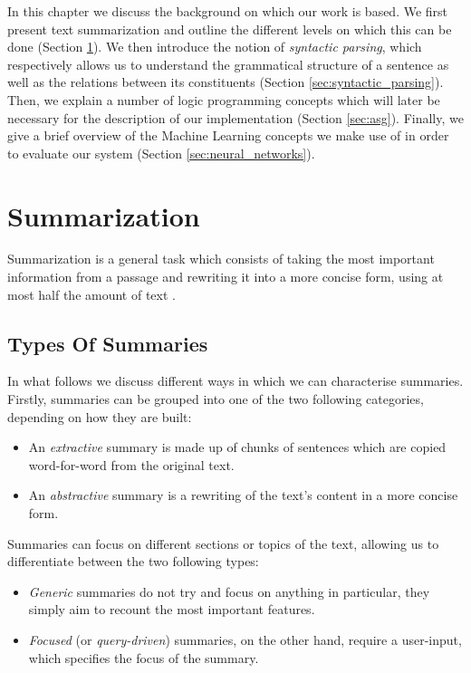 \label{chapter:background}

In this chapter we discuss the background on which our work is based. We first present text summarization and outline the different levels on which this can be done (Section \ref{sec:summarization}). We then introduce the notion of \textit{syntactic parsing}, which respectively allows us to understand the grammatical structure of a sentence as well as the relations between its constituents (Section \ref{sec:syntactic_parsing}). Then, we explain a number of logic programming concepts which will later be necessary for the description of our implementation (Section \ref{sec:asg}). Finally, we give a brief overview of the Machine Learning concepts we make use of in order to evaluate our system (Section \ref{sec:neural_networks}).

\section{Summarization}
\label{sec:summarization}

Summarization is a general task which consists of taking the most important information from a passage and rewriting it into a more concise form, using at most half the amount of text \cite{lloret_text_2008}.

\subsection{Types Of Summaries}

In what follows we discuss different ways in which we can characterise summaries. Firstly, summaries can be grouped into one of the two following categories, depending on how they are built:

\begin{itemize}
\item An \textit{extractive} summary is made up of chunks of sentences which are copied word-for-word from the original text.
\item An \textit{abstractive} summary is a rewriting of the text's content in a more concise form.
\end{itemize}

\noindent
Summaries can focus on different sections or topics of the text, allowing us to differentiate between the two following types:

\begin{itemize}
\item \textit{Generic} summaries do not try and focus on anything in particular, they simply aim to recount the most important features.
\item \textit{Focused} (or \textit{query-driven}) summaries, on the other hand, require a user-input, which specifies the focus of the summary.
\end{itemize}

